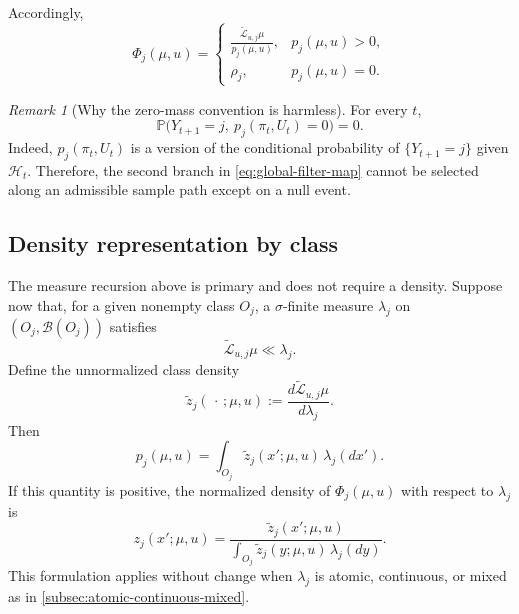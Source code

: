 \documentclass[10pt,twocolumn]{article}
\theoremstyle{remark}
\newtheorem{remark}{Remark}
\newcommand{\Pp}{\mathbb{P}}
\newcommand{\B}{\mathcal{B}}
\newcommand{\Hh}{\mathcal{H}}
\begin{document}
Accordingly,
\begin{equation}
	\Phi_j(\mu,u)
	=
	\begin{cases}
		\displaystyle
		\frac{\widetilde{\mathcal L}_{u,j}\mu}
		{p_j(\mu,u)},
		& p_j(\mu,u)>0,\\[2.2ex]
		\rho_j,
		& p_j(\mu,u)=0.
	\end{cases}
	\label{eq:global-filter-map}
\end{equation}

\begin{remark}[Why the zero-mass convention is harmless]
	\label{rem:zero-mass-harmless}
	For every \(t\),
	\[
	\Pp\bigl(Y_{t+1}=j,\ p_j(\pi_t,U_t)=0\bigr)=0.
	\]
	Indeed, \(p_j(\pi_t,U_t)\) is a version of the conditional probability of \(\{Y_{t+1}=j\}\) given \(\Hh_t\). Therefore, the second branch in \cref{eq:global-filter-map} cannot be selected along an admissible sample path except on a null event.
\end{remark}

\subsection{Density representation by class}
\label{subsec:recursive-density-class}

The measure recursion above is primary and does not require a density. Suppose now that, for a given nonempty class \(O_j\), a \(\sigma\)-finite measure \(\lambda_j\) on \((O_j,\B(O_j))\) satisfies
\begin{equation}
	\widetilde{\mathcal L}_{u,j}\mu\ll\lambda_j.
	\label{eq:unnormalized-class-absolute-continuity}
\end{equation}
Define the unnormalized class density
\begin{equation}
	\widetilde z_j(\,\cdot\,;\mu,u)
	:=
	\frac{d\widetilde{\mathcal L}_{u,j}\mu}{d\lambda_j}.
	\label{eq:unnormalized-class-density}
\end{equation}
Then
\begin{equation*}
	p_j(\mu,u)
	=
	\int_{O_j}\widetilde z_j(x';\mu,u)\,\lambda_j(dx').
	\label{eq:class-mass-density}
\end{equation*}
If this quantity is positive, the normalized density of \(\Phi_j(\mu,u)\) with respect to \(\lambda_j\) is
\begin{equation*}
	z_j(x';\mu,u)
	=
	\frac{\widetilde z_j(x';\mu,u)}
	{\displaystyle\int_{O_j}\widetilde z_j(y;\mu,u)\,\lambda_j(dy)}.
	\label{eq:normalized-class-density-recursion}
\end{equation*}
This formulation applies without change when \(\lambda_j\) is atomic, continuous, or mixed as in \cref{subsec:atomic-continuous-mixed}.
\end{document}
